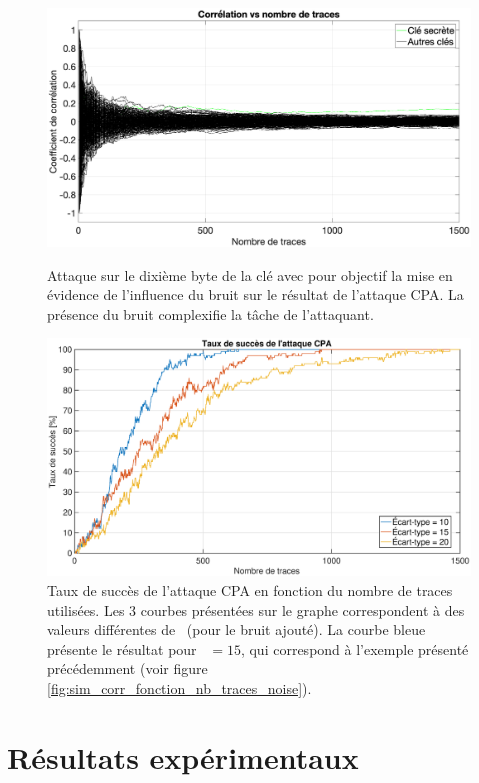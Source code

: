\documentclass[oneside]{book}
\begin{document}
\begin{figure}[htbp]
    \hspace{-2.3cm}
    \includegraphics[scale=0.4]{image/sim_corr_fonction_nb_traces_noise}
    \caption{Attaque sur le dixième byte de la clé avec pour objectif la mise en évidence de l'influence du bruit sur le résultat de l'attaque CPA. La présence du bruit complexifie la tâche de l'attaquant.}
    \label{fig:sim_corr_fonction_nb_traces_noise} 
    \hspace{-2.2cm}
    \includegraphics[scale=0.4]{image/success_rate_sim}
    \caption{Taux de succès de l'attaque CPA en fonction du nombre de traces utilisées. Les 3 courbes présentées sur le graphe correspondent à des valeurs différentes de \sigma \ (pour le bruit ajouté). La courbe bleue présente le résultat pour \sigma \ $= 15$, qui correspond à l'exemple présenté précédemment (voir figure \ref{fig:sim_corr_fonction_nb_traces_noise}).}
    \label{fig:success_rate_sim} 
\end{figure}

\newpage

\section{Résultats expérimentaux }
\label{sec:Exp_results_CPA}
\end{document}

